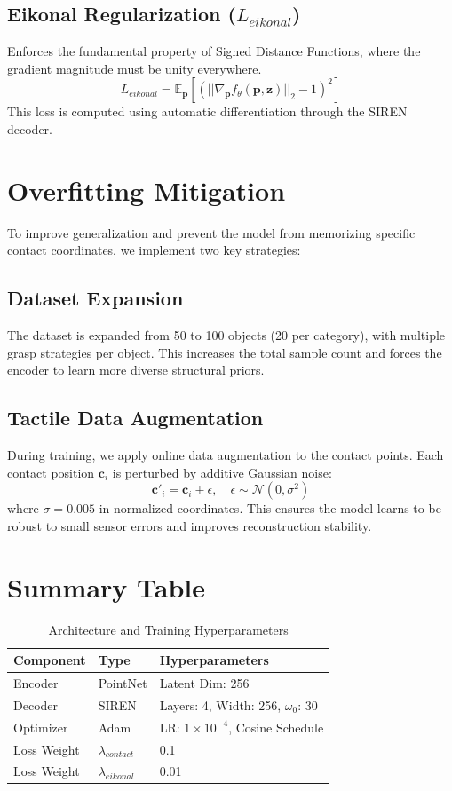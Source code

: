\documentclass[11pt,a4paper]{article}
\begin{document}
\subsection{Eikonal Regularization ($L_{eikonal}$)}
Enforces the fundamental property of Signed Distance Functions, where the gradient magnitude must be unity everywhere.
\begin{equation}
    L_{eikonal} = \mathbb{E}_{\mathbf{p}} [ (||\nabla_{\mathbf{p}} f_\theta(\mathbf{p}, \mathbf{z})||_2 - 1)^2 ]
\end{equation}
This loss is computed using automatic differentiation through the SIREN decoder.

\section{Overfitting Mitigation}
To improve generalization and prevent the model from memorizing specific contact coordinates, we implement two key strategies:

\subsection{Dataset Expansion}
The dataset is expanded from 50 to 100 objects (20 per category), with multiple grasp strategies per object. This increases the total sample count and forces the encoder to learn more diverse structural priors.

\subsection{Tactile Data Augmentation}
During training, we apply online data augmentation to the contact points. Each contact position $\mathbf{c}_i$ is perturbed by additive Gaussian noise:
\begin{equation}
    \mathbf{c}'_i = \mathbf{c}_i + \epsilon, \quad \epsilon \sim \mathcal{N}(0, \sigma^2)
\end{equation}
where $\sigma = 0.005$ in normalized coordinates. This ensures the model learns to be robust to small sensor errors and improves reconstruction stability.

\section{Summary Table}
\begin{table}[h]
    \centering
    \begin{tabular}{lll}
        \toprule
        \textbf{Component} & \textbf{Type} & \textbf{Hyperparameters} \\
        \midrule
        Encoder & PointNet & Latent Dim: 256 \\
        Decoder & SIREN & Layers: 4, Width: 256, $\omega_0$: 30 \\
        Optimizer & Adam & LR: $1 \times 10^{-4}$, Cosine Schedule \\
        Loss Weight & $\lambda_{contact}$ & 0.1 \\
        Loss Weight & $\lambda_{eikonal}$ & 0.01 \\
        \bottomrule
    \end{tabular}
    \caption{Architecture and Training Hyperparameters}
\end{table}
\end{document}
